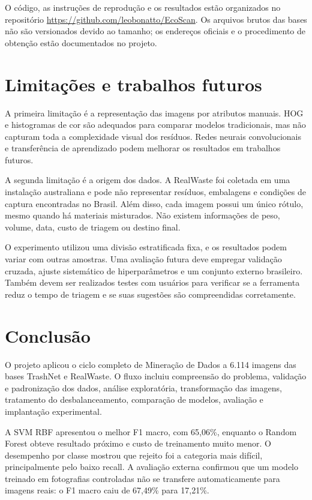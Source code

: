 \documentclass[11pt,a4paper]{article}
\begin{document}
O código, as instruções de reprodução e os resultados estão organizados no repositório \url{https://github.com/leobonatto/EcoScan}. Os arquivos brutos das bases não são versionados devido ao tamanho; os endereços oficiais e o procedimento de obtenção estão documentados no projeto.

\section{Limitações e trabalhos futuros}

A primeira limitação é a representação das imagens por atributos manuais. HOG e histogramas de cor são adequados para comparar modelos tradicionais, mas não capturam toda a complexidade visual dos resíduos. Redes neurais convolucionais e transferência de aprendizado podem melhorar os resultados em trabalhos futuros.

A segunda limitação é a origem dos dados. A RealWaste foi coletada em uma instalação australiana e pode não representar resíduos, embalagens e condições de captura encontradas no Brasil. Além disso, cada imagem possui um único rótulo, mesmo quando há materiais misturados. Não existem informações de peso, volume, data, custo de triagem ou destino final.

O experimento utilizou uma divisão estratificada fixa, e os resultados podem variar com outras amostras. Uma avaliação futura deve empregar validação cruzada, ajuste sistemático de hiperparâmetros e um conjunto externo brasileiro. Também devem ser realizados testes com usuários para verificar se a ferramenta reduz o tempo de triagem e se suas sugestões são compreendidas corretamente.

\section{Conclusão}

O projeto aplicou o ciclo completo de Mineração de Dados a 6.114 imagens das bases TrashNet e RealWaste. O fluxo incluiu compreensão do problema, validação e padronização dos dados, análise exploratória, transformação das imagens, tratamento do desbalanceamento, comparação de modelos, avaliação e implantação experimental.

A SVM RBF apresentou o melhor F1 macro, com 65,06\%, enquanto o Random Forest obteve resultado próximo e custo de treinamento muito menor. O desempenho por classe mostrou que rejeito foi a categoria mais difícil, principalmente pelo baixo recall. A avaliação externa confirmou que um modelo treinado em fotografias controladas não se transfere automaticamente para imagens reais: o F1 macro caiu de 67,49\% para 17,21\%.
\end{document}
